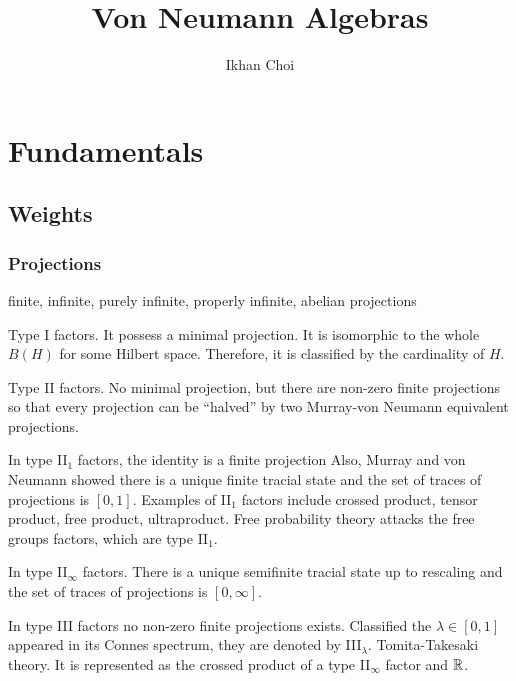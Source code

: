 \documentclass{../../large}
\begin{document}
\title{Von Neumann Algebras}
\author{Ikhan Choi}
\maketitle
\tableofcontents

\iffalse
injectivity
Connes embeddability
property Gamma
Connes' bicentralizer problem
Shlyakhtenko semicircular system
group stability
bimodule
noncommutative probability
\fi


\part{Fundamentals}


\chapter{Weights}

\section{Projections}


finite, infinite, purely infinite, properly infinite, abelian projections




\bigskip
Type I factors.
It possess a minimal projection.
It is isomorphic to the whole $B(H)$ for some Hilbert space.
Therefore, it is classified by the cardinality of $H$.

Type II factors.
No minimal projection, but there are non-zero finite projections so that every projection can be ``halved'' by two Murray-von Neumann equivalent projections.

In type II$_1$ factors, the identity is a finite projection
Also, Murray and von Neumann showed there is a unique finite tracial state and the set of traces of projections is $[0,1]$.
Examples of II$_1$ factors include crossed product, tensor product, free product, ultraproduct.
Free probability theory attacks the free groups factors, which are type II$_1$.

In type II$_\infty$ factors.
There is a unique semifinite tracial state up to rescaling and the set of traces of projections is $[0,\infty]$.

In type III factors no non-zero finite projections exists.
Classified the $\lambda\in[0,1]$ appeared in its Connes spectrum, they are denoted by III$_\lambda$.
Tomita-Takesaki theory.
It is represented as the crossed product of a type II$_\infty$ factor and $\mathbb{R}$.
\end{document}

